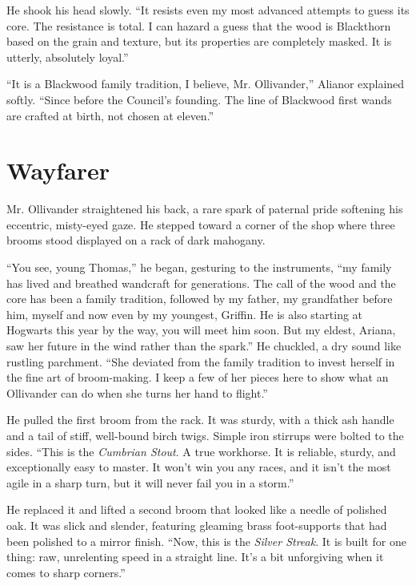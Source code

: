 He shook his head slowly. \enquote{It resists even my most advanced attempts to guess its core. The resistance is total. I can hazard a guess that the wood is Blackthorn based on the grain and texture, but its properties are completely masked. It is utterly, absolutely loyal.}

\enquote{It is a Blackwood family tradition, I believe, Mr. Ollivander,} Alianor explained softly. \enquote{Since before the Council's founding. The line of Blackwood first wands are crafted at birth, not chosen at eleven.}

\section*{Wayfarer}

Mr. Ollivander straightened his back, a rare spark of paternal pride softening his eccentric, misty-eyed gaze. He stepped toward a corner of the shop where three brooms stood displayed on a rack of dark mahogany.

\enquote{You see, young Thomas,} he began, gesturing to the instruments, \enquote{my family has lived and breathed wandcraft for generations. The call of the wood and the core has been a family tradition, followed by my father, my grandfather before him, myself and now even by my youngest, Griffin. He is also starting at Hogwarts this year by the way, you will meet him soon. But my eldest, Ariana, saw her future in the wind rather than the spark.} He chuckled, a dry sound like rustling parchment. \enquote{She deviated from the family tradition to invest herself in the fine art of broom-making. I keep a few of her pieces here to show what an Ollivander can do when she turns her hand to flight.}

He pulled the first broom from the rack. It was sturdy, with a thick ash handle and a tail of stiff, well-bound birch twigs. Simple iron stirrups were bolted to the sides. \enquote{This is the \textit{Cumbrian Stout}. A true workhorse. It is reliable, sturdy, and exceptionally easy to master. It won't win you any races, and it isn't the most agile in a sharp turn, but it will never fail you in a storm.}

He replaced it and lifted a second broom that looked like a needle of polished oak. It was slick and slender, featuring gleaming brass foot-supports that had been polished to a mirror finish. \enquote{Now, this is the \textit{Silver Streak}. It is built for one thing: raw, unrelenting speed in a straight line. It's a bit unforgiving when it comes to sharp corners.}

